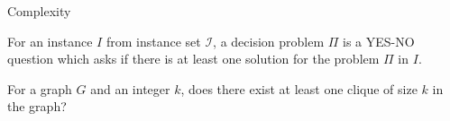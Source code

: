\documentclass{beamer}
\begin{document}
\begin{comment}
\item $L$ is in $NP$.
\end{enumerate}
\end{itemize}
\end{frame}


\begin{frame}{Is $P = NP$ or $P \not= NP$?}

\newcommand{\boundellipse}[3]%
{(#1) ellipse (#2 and #3)
}

\begin{figure}[!ht]
\centering


\begin{tikzpicture}
\draw (0,0) circle (1.5cm);
\draw \boundellipse{0,-0.75}{1.1}{0.75};
\draw (-1.5,3) .. controls (-1,0) and (1,0) .. (1.5,3);
\node at (0,2) {\tiny $NP$-Hard};
\node at (0,1.2) {\tiny $NP$-Complete};
\node at (-1,0) {\tiny $NP$};
\node at (0,-0.75) {\tiny $P$};
\node at (0,-2) {\tiny $P \not= NP$};
\node at (4,1) [label={[rotate=90]{\tiny complexity}}];
\draw[->] (4,-2) -- (4,4);
\draw (8,0) circle (1.5cm);

\draw (6.5,2) .. controls (5.40,-2.7) and (10.6,-2.7) .. (9.5,2);
\node at (8,2) {\tiny $NP$-Hard};
\node at (8,0) {\tiny $NP$-Complete = $P$ = $NP$};

\node at (8,-2) {\tiny $P = NP$};
\end{tikzpicture}
\caption{\tiny Euler diagram for $P$, $NP$, $NP$-hard and $NP$-complete set of problems}
\end{figure}
\end{frame}
\end{comment}

\begin{frame}{Complexity}

\begin{definition}
For an instance $I$ from instance set $\mathcal{I}$, a \color{red} decision problem \color{black} $\Pi$ is a YES-NO question which asks if
there is at least one solution for the problem $\Pi$ in $I$.
\end{definition}
 
\begin{example}
For a graph $G$ and an integer $k$, does there exist at least one clique of size $k$ in the graph? 

\end{example}
\end{frame}
\end{document}
